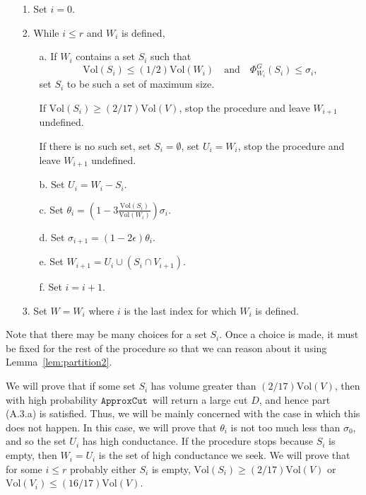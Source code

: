 \documentclass[11pt]{article}
\newcommand{\approxcut}{\ensuremath{\mathtt{ApproxCut}}}
\def\union{\cup}
\def\intersect{\cap}
\def\intersect{\cap}
\def\vol#1{\mathrm{Vol}\left(#1  \right)}
\def\conducin#1#2{\Phi^{G}_{#1}\left(#2  \right)}
\begin{document}
\begin{itemize}

\item [1.] Set $i = 0$.

\item [2.] While $i \leq r$ and $W_{i}$ is defined,

\begin{itemize}

\item [a.] If $W_{i}$ contains a set $S_{i}$
 such that
\[
  \vol{S_{i}} \leq (1/2) \vol{W_{i}}
\quad
\text{and}
\quad
\conducin{W_{i}}{S_{i}} \leq \sigma_{i},
\]
set $S_{i}$ to be such a set of maximum size.

If $\vol{S_{i}} \geq (2/17) \vol{V}$, 
  stop the procedure and leave $W_{i+1}$ undefined.

If there is no such set, set $S_{i} = \emptyset$, set $U_{i} = W_{i}$,
  stop the procedure and leave $W_{i+1}$ undefined.



\item [b.] Set $U_{i} = W_{i} - S_{i}$.
\item [c.] Set $\theta_{i} =
   \left(1 - 3 \frac{\vol{S_{i}}}{\vol{W_{i}}} \right) \sigma_{i}$.

\item [d.] Set $\sigma_{i+1} = (1 - 2 \epsilon) \theta_{i}$.

\item [e.] Set $W_{i+1} = U_{i} \union (S_{i} \intersect  V_{i+1})$.

\item [f.] Set $i = i + 1$.



\end{itemize}

\item [3.] Set $W = W_{i}$ where $i$ is the last index for which $W_{i}$ is defined.
\end{itemize}

Note that there may be many choices for a set $S_{i}$.
Once a choice is made, it must be fixed for the rest of the procedure so that
  we can reason about it using Lemma~\ref{lem:partition2}.

We will prove that if some set $S_{i}$ has volume
  greater than $(2/17) \vol{V}$, then with high probability \approxcut \
  will return a large cut $D$, and hence part (A.3.a) is satisfied.
Thus, we will be mainly concerned with the case in which this does not happen.
In this case, we will prove that $\theta_{i}$ is not too much less than $\sigma_{0}$,
and so the set $U_{i}$ has high conductance.
If the procedure stops because $S_{i}$ is empty, then $W_{i} = U_{i}$
  is the set of high conductance we seek.
We will prove that for some $i \leq r$ probably either $S_{i}$ is empty, 
  $\vol{S_{i}} \geq (2/17) \vol{V}$ or $\vol{V_{i}} \leq (16/17) \vol{V}$.
\end{document}
